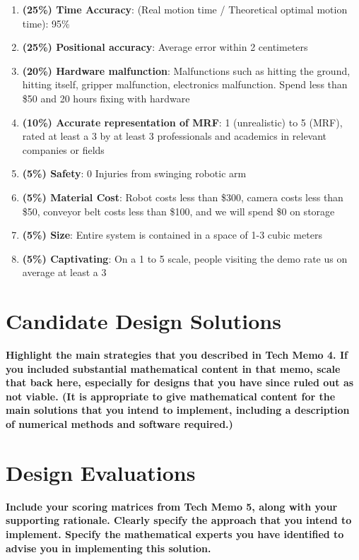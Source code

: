 \documentclass [11pt ]{ report}
\renewcommand{\b}{\textbf}
\begin{document}
\begin{enumerate}

\item \textbf{(25\%) Time Accuracy}: (Real motion time / Theoretical optimal motion time): 95\%
\item \textbf{(25\%) Positional accuracy}: Average error within 2 centimeters
\item \textbf{(20\%) Hardware malfunction}: Malfunctions such as hitting the ground, hitting itself, gripper malfunction, electronics malfunction. Spend less than \$50 and 20 hours fixing with hardware
\item \textbf{(10\%) Accurate representation of MRF}: 1 (unrealistic) to 5 (MRF), rated at least a 3 by at least 3 professionals and academics in relevant companies or fields
\item \textbf{(5\%) Safety}: 0 Injuries from swinging robotic arm
\item \textbf{(5\%) Material Cost}: Robot costs less than \$300, camera costs less than \$50, conveyor belt costs less than \$100, and we will spend \$0 on storage 
\item \textbf{(5\%) Size}: Entire system is contained in a space of 1-3 cubic meters
\item \textbf{(5\%) Captivating}: On a 1 to 5 scale, people visiting the demo rate us on average at least a 3

\end{enumerate}


\section{Candidate Design Solutions}
\b{Highlight the main strategies that you described in Tech Memo 4.
If you included substantial mathematical content in that memo, scale that back here, especially
for designs that you have since ruled out as not viable. (It is appropriate to give mathematical
content for the main solutions that you intend to implement, including a description
of numerical methods and software required.)}

\section{Design Evaluations}
\b{Include your scoring matrices from Tech Memo 5, along with your
supporting rationale. Clearly specify the approach that you intend to implement. Specify the
mathematical experts you have identified to advise you in implementing this solution.}
\end{document}
